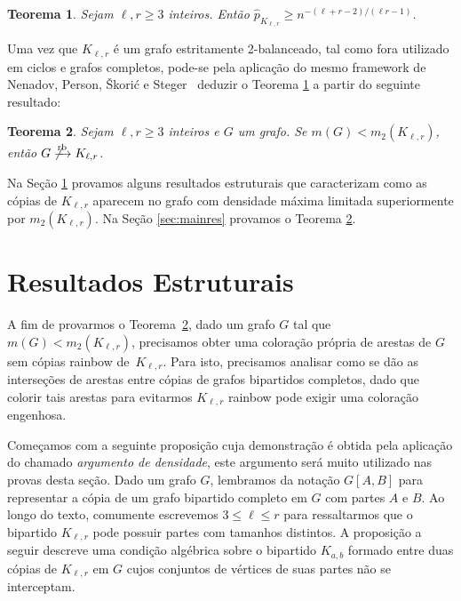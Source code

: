 \documentclass[12pt,a4paper]{book}
\newcommand{\K}{K_{\ell,r}} %
\newcommand{\rb}{\xrightarrow{\text{\rm rb}}}
\newtheorem{teorema}{Teorema}[chapter]
\begin{document}
    \begin{teorema}\label{teo:mainrb} 
    Sejam $\ell,r \geq 3$ inteiros. 
    Então $\hat{p}_{K_{\ell,r}}\geq n^{-(\ell+r-2)/(\ell r - 1)}$.
    \end{teorema}

    Uma vez que $\K$ é um grafo estritamente 2-balanceado, tal como fora utilizado em ciclos e grafos completos, pode-se pela aplicação do mesmo framework de Nenadov, Person, Škorić e Steger~\cite{NePeSkSt14} deduzir o Teorema \ref{teo:mainrb} a partir do seguinte resultado: %
    
    \begin{teorema}\label{lemma:main} 
        Sejam $\ell,r \geq 3$ inteiros e
        $G$ um grafo. 
        Se $m(G) < m_2(\K)$, então $G \not\rb \K$.
    \end{teorema}

    Na Seção \ref{sec:rbestrut} provamos alguns resultados estruturais que caracterizam como as cópias de $\K$ aparecem no grafo com densidade máxima limitada superiormente por $m_2(\K)$.
    Na Seção \ref{sec:mainres} provamos o Teorema \ref{lemma:main}.

\section{Resultados Estruturais}
\label{sec:rbestrut}

     A fim de provarmos o Teorema~\ref{lemma:main}, dado um grafo $G$ tal que
     $m(G) < m_2(\K)$, 
     precisamos obter uma coloração própria de arestas de $G$ sem cópias rainbow de~$\K$. 
     Para isto, precisamos analisar como se dão as interseções de arestas entre cópias de grafos bipartidos completos, dado que colorir tais arestas para evitarmos $\K$ rainbow pode exigir uma coloração engenhosa. 
     
     Começamos com a seguinte proposição cuja demonstração é obtida
     pela aplicação do chamado \textit{argumento de densidade}, este argumento será muito utilizado nas provas desta seção.
    Dado um grafo $G$, lembramos da notação $G[A,B]$ para representar a cópia de um grafo bipartido completo em $G$ com partes $A$ e $B$.
    Ao longo do texto, comumente escrevemos $3\leq \ell \leq r$ para ressaltarmos que o bipartido $\K$ pode possuir partes com tamanhos distintos. 
    A proposição a seguir descreve uma condição algébrica sobre o bipartido $K_{a,b}$ formado entre duas cópias de $\K$ em $G$ cujos conjuntos de vértices de suas partes não se interceptam.
\end{document}
